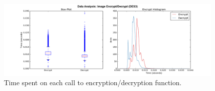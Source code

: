 \documentclass[journal,twoside]{JoPhA}
\begin{document}
\begin{figure}[ht]
    \centering
    \includegraphics[width=.9\textwidth]{Outline_images_encryption_decrytiontime2.png}
    \caption{Time spent on each call to encryption/decryption function.}
  \label{fig:images_encryption}
\end{figure}
% 
% 
% 
% 
\end{document}
